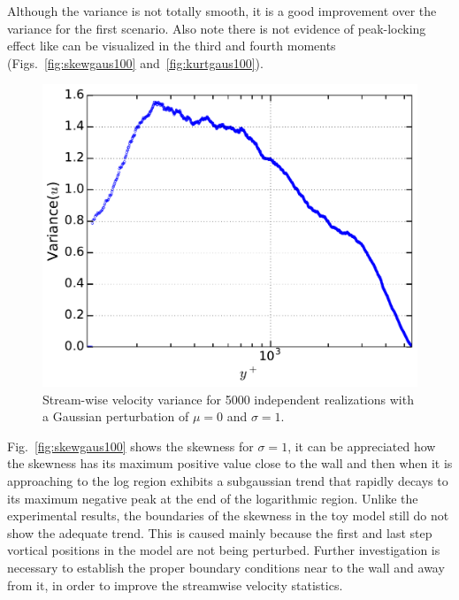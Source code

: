 \documentclass[aps,reprint,amsmath,amssymb,pra]{revtex4-1}%
\begin{document}
Although the variance is not totally smooth, it is a good improvement over the variance for the first scenario. Also note there is not evidence of peak-locking effect like can be visualized in the third and fourth moments (Figs.~\ref{fig:skewgaus100} and~\ref{fig:kurtgaus100}). 
\begin{figure}[b]
\includegraphics[scale=0.46]{figures/variance_5000_assembles_gauss100}
\caption{\label{fig:varigaus100} Stream-wise velocity variance for 5000 independent realizations with a Gaussian perturbation of $\mu=0$ and $\sigma=1$.}
\end{figure}
Fig.~\ref{fig:skewgaus100} shows the skewness for $\sigma=1$, it can be appreciated how the skewness has its maximum positive value close to the wall and then when it is approaching to the log region exhibits a subgaussian trend that rapidly decays to its maximum negative peak at the end of the logarithmic region. Unlike the experimental results, the boundaries of the skewness in the toy model still do not show the adequate trend. This is caused mainly because the first and last step vortical positions in the model are not being perturbed. Further investigation is necessary to establish the proper boundary conditions near to the wall and away from it, in order to improve the streamwise velocity statistics.
\end{document}
